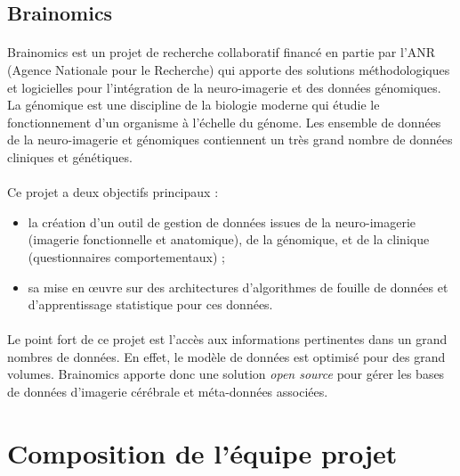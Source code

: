 \documentclass {report}
\begin{document}
\subsection{Brainomics}

\paragraph{}
Brainomics est un projet de recherche collaboratif financé en partie par l'ANR (Agence Nationale pour le Recherche) qui apporte des solutions méthodologiques et logicielles pour l'intégration de la neuro-imagerie et des données génomiques. La génomique est une discipline de la biologie moderne qui étudie le fonctionnement d'un organisme à l'échelle du génome. Les ensemble de données de la neuro-imagerie et génomiques contiennent un très grand nombre de données cliniques et génétiques. 

\paragraph{}
Ce projet a deux objectifs principaux :
\begin{itemize}
\item la création d'un outil de gestion de données issues de la neuro-imagerie (imagerie fonctionnelle et anatomique), de la génomique, et de la clinique (questionnaires comportementaux) ;
\item sa mise en œuvre sur des architectures d'algorithmes de fouille de données et d'apprentissage statistique pour ces données.
\end{itemize}

\paragraph{}
Le point fort de ce projet est l'accès aux informations pertinentes dans un grand nombres de données. En effet, le modèle de données est optimisé pour des grand volumes. Brainomics apporte donc une solution \textit{open source} pour gérer les bases de données d'imagerie cérébrale et méta-données associées. 



\section{Composition de l'équipe projet}
\end{document}
